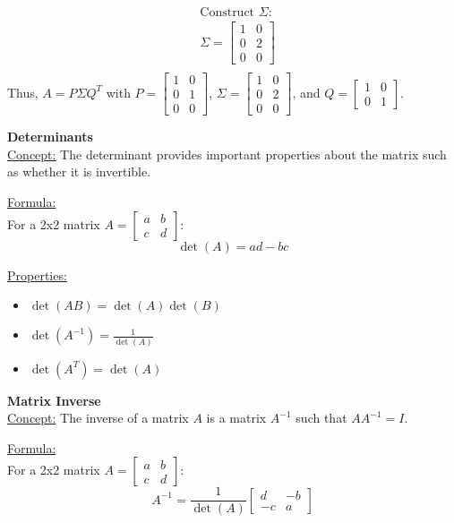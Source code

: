 \documentclass[8pt, a4paper, landscape]{extarticle} %
\begin{document}
\begin{multicols*}{4}
\[\begin{aligned}
       & \text{Construct } \Sigma:                                                                                                                                         \\
       & \Sigma = \begin{bmatrix} 1 & 0 \\ 0 & 2 \\ 0 & 0 \end{bmatrix}                                                                                                    \\
    \end{aligned}
  \]
  Thus, \( A = P \Sigma Q^T \) with \( P = \begin{bmatrix} 1 & 0 \\ 0 & 1 \\ 0 & 0 \end{bmatrix} \), \( \Sigma = \begin{bmatrix} 1 & 0 \\ 0 & 2 \\ 0 & 0 \end{bmatrix} \), and \( Q = \begin{bmatrix} 1 & 0 \\ 0 & 1 \end{bmatrix} \).

  \textbf{Determinants}\\
  \underline{Concept:} The determinant provides important properties about the matrix such as whether it is invertible.

  \underline{Formula:}\\
  For a 2x2 matrix \( A = \begin{bmatrix} a & b \\ c & d \end{bmatrix} \):
  \[ \det(A) = ad - bc \]

  \underline{Properties:}
  \begin{itemize}
    \item \(\det(AB) = \det(A) \det(B)\)
    \item \(\det(A^{-1}) = \frac{1}{\det(A)}\)
    \item \(\det(A^T) = \det(A)\)
  \end{itemize}

  \textbf{Matrix Inverse}\\
  \underline{Concept:} The inverse of a matrix \( A \) is a matrix \( A^{-1} \) such that \( AA^{-1} = I \).

  \underline{Formula:}\\
  For a 2x2 matrix \( A = \begin{bmatrix} a & b \\ c & d \end{bmatrix} \):
  \[ A^{-1} = \frac{1}{\det(A)} \begin{bmatrix} d & -b \\ -c & a \end{bmatrix} \]


\end{multicols*}
\end{document}
